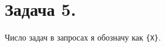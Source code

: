 \documentclass[a4paper, 12pt]{article}
\newcommand{\z}[1]{\section*{Задача #1.}}
\begin{document}
\z 5

Число задач в запросах я обозначу как \texttt{\{X\}}.

\begin{comment}
Нас устраивают два типа задач: те, которые завершились не с первой попытки и те, что вообще не завершились. Первым запросом определим первый тип, вторым --- второй, и соединим результаты запросов с помощью \texttt{UNION}.

Напишем первый запрос. Если задача завершилась не с первой попытки, то её \texttt{task\_id} больше 100, и изначальный \texttt{id} равен остатку от \texttt{task\_id} по модулю 100, так как при каждом перезапуске это число не менялось. Таким образом, мы выбираем те \texttt{task\_id}, которые больше 100 и рассматриваем их остатки по модулю 100.

Первый запрос:
\begin{verbatim}
SELECT MOD(task_id, {X}) AS task_base_id FROM tasks WHERE task_id >= {X};
\end{verbatim}

Второй запрос немного сложнее. Нам надо выяснить, каких остатков при делении на 100 нет среди остатков \texttt{task\_id} при делении на 100. Для этого сначала научимся генерировать множество остатков. Это можно сделать с помощью команды \texttt{GENERATE\_SERIES(from,~to)}. Она создаёт набор чисел от \texttt{from} до \texttt{to} (обе границы включительно). Теперь сделаем \texttt{JOIN} этих таблиц, и возьмём те строчки, где к \texttt{generate\_series} приклеилось \texttt{NULL} --- это и будет означать отсутствие конкретного остатка.
\newpage
Второй запрос:
\begin{verbatim}
SELECT generate_series AS task_base_id FROM
(tasks RIGHT JOIN GENERATE_SERIES(0, {X-1}) ON MOD(task_id, {X}) = generate_series)
WHERE task_id IS NULL;
\end{verbatim}

Соединив результаты этих запросов, получаем запрос, который требовался.

Итоговый запрос:
\begin{verbatim}
SELECT MOD(task_id, {X}) AS task_base_id FROM tasks WHERE task_id >= {X}
UNION
SELECT generate_series AS task_base_id FROM
(tasks RIGHT JOIN GENERATE_SERIES(0, {X-1}) ON MOD(task_id, {X}) = generate_series)
WHERE task_id IS NULL;
\end{verbatim}

В случае недоступности функции \texttt{GENERATE\_SERIES} из-за другой СУБД можно использовать её аналоги (например, \texttt{seq\_0\_to\_\{X-1\}}). Если же и этого нет, второй запрос придётся переписывать чуть менее красиво:


\end{comment}
\end{document}
